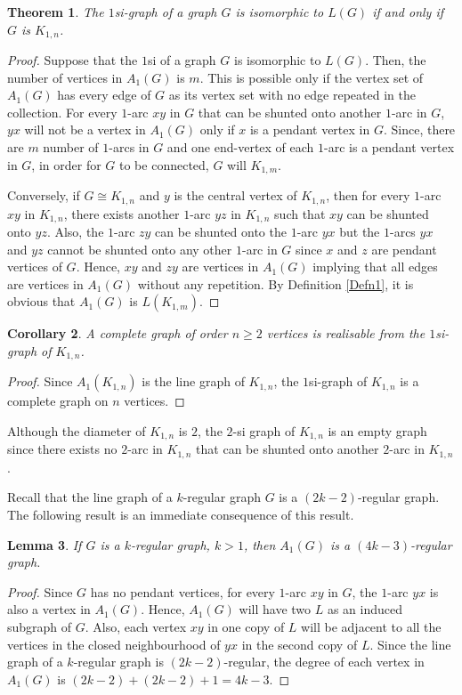 \documentclass[12pt,a4paper,twoside]{article}
\newtheorem{theorem}{Theorem}[section]
\newtheorem{lemma}[theorem]{Lemma}
\newtheorem{corollary}[theorem]{Corollary}
\theoremstyle{casesty}
\theoremstyle{subcasesty}
\theoremstyle{schemesty}
\begin{document}
\begin{theorem}
	The $1$si-graph of a graph $G$ is isomorphic to $L(G)$ if and only if $G$ is $K_{1,n}$.
\end{theorem}
\begin{proof}
	Suppose that the $1$si of a graph $G$ is isomorphic to $L(G)$. Then, the number of vertices in $A_{1}(G)$ is $m$. This is possible only if the vertex set of $A_{1}(G)$ has every edge of $G$ as its vertex set with no edge repeated in the collection. For every $1$-arc $xy$ in $G$ that can be shunted onto another $1$-arc in $G$, $yx$ will not be a vertex in $A_{1}(G)$ only if $x$ is a pendant vertex in $G$. Since, there are $m$ number of $1$-arcs in $G$ and one end-vertex of each $1$-arc is a pendant vertex in $G$, in order for $G$ to be connected, $G$ will $K_{1,m}$.
	
	Conversely, if $G \cong K_{1,n}$ and $y$ is the central vertex of $K_{1,n}$, then for every $1$-arc $xy$ in $K_{1,n}$, there exists another $1$-arc $yz$ in $K_{1,n}$ such that $xy$ can be shunted onto $yz$. Also, the $1$-arc $zy$ can be shunted onto the $1$-arc $yx$ but the $1$-arcs $yx$ and $yz$ cannot be shunted onto any other $1$-arc in $G$ since $x$ and $z$ are pendant vertices of $G$. Hence, $xy$ and $zy$ are vertices in $A_{1}(G)$ implying that all edges are vertices in $A_{1}(G)$ without any repetition. By Definition \ref{Defn1}, it is obvious that $A_{1}(G)$ is $L(K_{1,m})$.
\end{proof}

\begin{corollary} \label{AsKn}
	A complete graph of order $n \geq 2$ vertices is realisable from the $1$si-graph of $K_{1,n}$. 
\end{corollary}
\begin{proof}
	Since $A_{1}(K_{1,n})$ is the line graph of $K_{1,n}$, the $1$si-graph of $K_{1,n}$ is a complete graph on $n$ vertices.
\end{proof}

Although the diameter of $K_{1,n}$ is $2$, the $2$-si graph of $K_{1,n}$ is an empty graph since there exists no $2$-arc in $K_{1,n}$ that can be shunted onto another $2$-arc in $K_{1,n}$.

Recall that the line graph of a $k$-regular graph $G$ is a $(2k-2)$-regular graph. The following result is an immediate consequence of this result.

\begin{lemma} \label{1arcregualr}
	If $G$ is a $k$-regular graph, $k>1$, then $A_{1}(G)$ is a $(4k-3)$-regular graph.
\end{lemma}
\begin{proof}
	Since $G$ has no pendant vertices, for every $1$-arc $xy$ in $G$, the $1$-arc $yx$ is also a vertex in $A_{1}(G)$. Hence, $A_{1}(G)$ will have two $L$ as an induced subgraph of $G$. Also, each vertex $xy$ in one copy of $L$ will be adjacent to all the vertices in the closed neighbourhood of $yx$ in the second copy of $L$. Since the line graph of a $k$-regular graph is $(2k-2)$-regular, the degree of each vertex in $A_{1}(G)$ is $(2k-2) + (2k-2) +1 = 4k-3$.
\end{proof}
\end{document}
